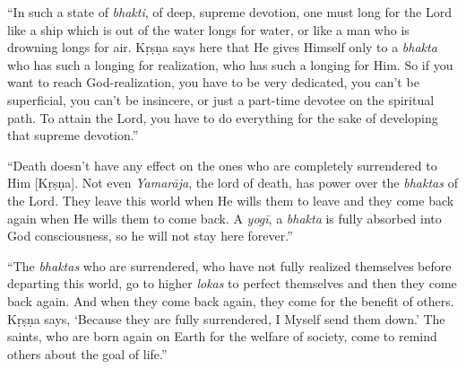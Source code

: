 \enquote{In such a state of \textit{bhakti}, of deep, supreme devotion, one must long for the Lord like a ship which is out of the water longs for water, or like a man who is drowning longs for air. Kṛṣṇa says here that He gives Himself only to a \textit{bhakta} who has such a longing for realization, who has such a longing for Him. So if you want to reach God-realization, you have to be very dedicated, you can’t be superficial, you can’t be insincere, or just a part-time devotee on the spiritual path. To attain the Lord, you have to do everything for the sake of developing that supreme devotion.}

\enquote{Death doesn’t have any effect on the ones who are completely surrendered to Him [Kṛṣṇa]. Not even \textit{Yamarāja}, the lord of death, has power over the \textit{bhaktas} of the Lord. They leave this world when He wills them to leave and they come back again when He wills them to come back. A \textit{yogī}, a \textit{bhakta} is fully absorbed into God consciousness, so he will not stay here forever.}

\enquote{The \textit{bhaktas} who are surrendered, who have not fully realized themselves before departing this world, go to higher \textit{lokas} to perfect themselves and then they come back again. And when they come back again, they come for the benefit of others. Kṛṣṇa says, \enquote{Because they are fully surrendered, I Myself send them down.} The saints, who are born again on Earth for the welfare of society, come to remind others about the goal of life.}

